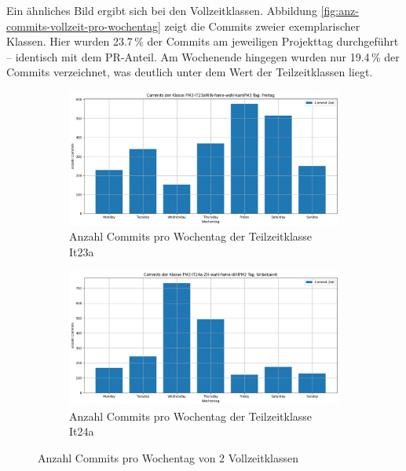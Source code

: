 Ein ähnliches Bild ergibt sich bei den Vollzeitklassen. Abbildung \autoref{fig:anz-commits-vollzeit-pro-wochentag} zeigt die Commits zweier exemplarischer Klassen. Hier wurden 23.7\,\% der Commits am jeweiligen Projekttag durchgeführt – identisch mit dem PR-Anteil. Am Wochenende hingegen wurden nur 19.4\,\% der Commits verzeichnet, was deutlich unter dem Wert der Teilzeitklassen liegt.

\begin{figure}[htbp]
    \centering
    \begin{subfigure}[b]{0.48\textwidth}
        \centering
        \includegraphics[width=\textwidth]{Figures/commits-klasse-per-wochentag-23a.png}
         \caption{Anzahl Commits pro Wochentag der Teilzeitklasse It23a}
        \label{fig:anzahl-commits-pro-wochentag-it23a}
    \end{subfigure}
    \hfill
    \begin{subfigure}[b]{0.48\textwidth}
        \centering
        \includegraphics[width=\textwidth]{Figures/commits-klasse-per-wochentag-24a.png}
         \caption{Anzahl Commits pro Wochentag der Teilzeitklasse It24a}
        \label{fig:anzahl-commits-pro-wochentag-it24a}
    \end{subfigure}
    \caption{Anzahl Commits pro Wochentag von 2 Vollzeitklassen}
    \label{fig:anz-commits-vollzeit-pro-wochentag}
\end{figure}

